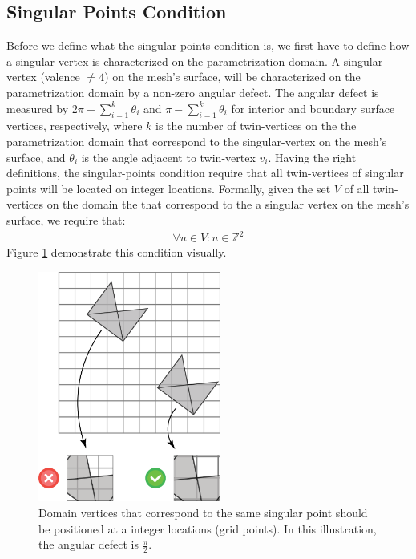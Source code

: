 \subsection{Singular Points Condition}
\label{section:singular_points_cond}
Before we define what the singular-points condition is, we first have to define how a singular vertex is characterized on the parametrization domain. A singular-vertex (valence $\neq 4$) on the mesh's surface, will be characterized on the parametrization domain by a non-zero angular defect. The angular defect is measured by $2\pi - \sum_{i=1}^k \theta_i$ and $\pi - \sum_{i=1}^k \theta_i$ for interior and boundary surface vertices, respectively, where $k$ is the number of twin-vertices on the the parametrization domain that correspond to the singular-vertex on the mesh's surface, and $\theta_i$ is the angle adjacent to twin-vertex $v_i$.
Having the right definitions, the singular-points condition require that all twin-vertices of singular points will be located on integer locations. Formally, given the set $V$ of all twin-vertices on the domain the that correspond to the a singular vertex on the mesh's surface, we require that:
\begin{equation}\label{eq:singular_points_cond}
\begin{split}
\forall u \in V: u \in \mathbb{Z}^2
\end{split}
\end{equation}
Figure \ref{fig:singular_points_req} demonstrate this condition visually.
\begin{figure}[ht]
\centering
\includegraphics[width=6cm]{figures/singular_points/singularity.png}
\caption[The Singular Points Requirement]{Domain vertices that correspond to the same singular point should be positioned at a integer locations (grid points). In this illustration, the angular defect is $\frac{\pi}{2}$.}
\label{fig:singular_points_req}
\end{figure}
